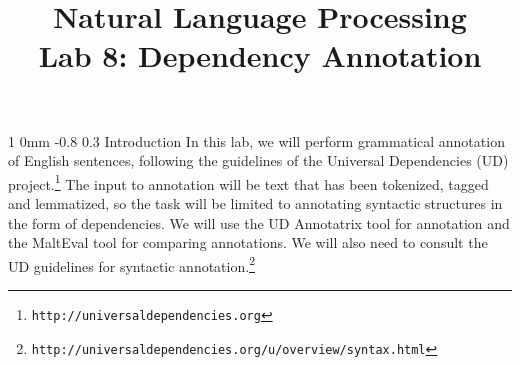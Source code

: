 \documentclass[10.9pt]{article}
\title{{\LARGE Natural Language Processing}\\[1.5mm]{\large Lab 8: Dependency Annotation}}
\author{}
\date{} %
\makeatletter
\newcommand{\newsec}[2]{\section{#1}\label{sec:#2}\noindent}
\renewcommand{\section}{\@startsection
{section}%
{1}%
{0mm}%
{-0.8\baselineskip}%
{0.3\baselineskip}%
{\bfseries\large}}%
\makeatother
\begin{document}
 

\maketitle
\vspace{-2mm}
\newsec{Introduction}{intro}%
In this lab, we will perform grammatical annotation of English sentences, following the guidelines of the Universal Dependencies (UD) project.\footnote{{\tt http://universaldependencies.org}} The input to annotation will be text that has been tokenized, tagged and lemmatized, so the task will be limited to annotating syntactic structures
in the form of dependencies. 
We will use the UD Annotatrix tool for annotation and the MaltEval tool for comparing annotations. We will also need to consult the UD guidelines for syntactic annotation.\footnote{{\tt http://universaldependencies.org/u/overview/syntax.html}}
\end{document}
